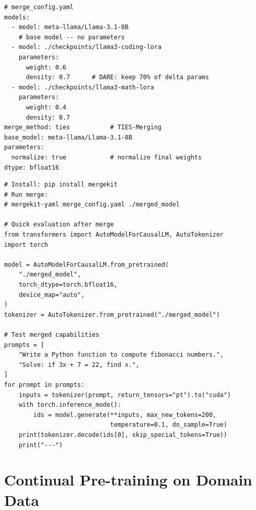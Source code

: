 \begin{lstlisting}[style=pythonstyle, caption={TIES-merging two LoRA fine-tunes with mergekit (YAML config)}]
# merge_config.yaml
models:
  - model: meta-llama/Llama-3.1-8B
    # base model -- no parameters
  - model: ./checkpoints/llama3-coding-lora
    parameters:
      weight: 0.6
      density: 0.7      # DARE: keep 70% of delta params
  - model: ./checkpoints/llama3-math-lora
    parameters:
      weight: 0.4
      density: 0.7
merge_method: ties           # TIES-Merging
base_model: meta-llama/Llama-3.1-8B
parameters:
  normalize: true            # normalize final weights
dtype: bfloat16
\end{lstlisting}

\begin{lstlisting}[style=pythonstyle, caption={Running mergekit and evaluating the merged model}]
# Install: pip install mergekit
# Run merge:
# mergekit-yaml merge_config.yaml ./merged_model

# Quick evaluation after merge
from transformers import AutoModelForCausalLM, AutoTokenizer
import torch

model = AutoModelForCausalLM.from_pretrained(
    "./merged_model",
    torch_dtype=torch.bfloat16,
    device_map="auto",
)
tokenizer = AutoTokenizer.from_pretrained("./merged_model")

# Test merged capabilities
prompts = [
    "Write a Python function to compute fibonacci numbers.",
    "Solve: if 3x + 7 = 22, find x.",
]
for prompt in prompts:
    inputs = tokenizer(prompt, return_tensors="pt").to("cuda")
    with torch.inference_mode():
        ids = model.generate(**inputs, max_new_tokens=200,
                             temperature=0.1, do_sample=True)
    print(tokenizer.decode(ids[0], skip_special_tokens=True))
    print("---")
\end{lstlisting}

\section{Continual Pre-training on Domain Data}

